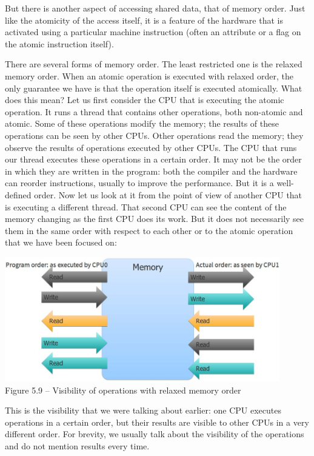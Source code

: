 But there is another aspect of accessing shared data, that of memory order. Just like the atomicity of the access itself, it is a feature of the hardware that is activated using a particular machine instruction (often an attribute or a flag on the atomic instruction itself).

There are several forms of memory order. The least restricted one is the relaxed memory order. When an atomic operation is executed with relaxed order, the only guarantee we have is that the operation itself is executed atomically. What does this mean? Let us first consider the CPU that is executing the atomic operation. It runs a thread that contains other operations, both non-atomic and atomic. Some of these operations modify the memory; the results of these operations can be seen by other CPUs. Other operations read the memory; they observe the results of operations executed by other CPUs. The CPU that runs our thread executes these operations in a certain order. It may not be the order in which they are written in the program: both the compiler and the hardware can reorder instructions, usually to improve the performance. But it is a well-defined order. Now let us look at it from the point of view of another CPU that is executing a different thread. That second CPU can see the content of the memory changing as the first CPU does its work. But it does not necessarily see them in the same order with respect to each other or to the atomic operation that we have been focused on:

\begin{center}
\includegraphics[width=0.9\textwidth]{content/1/chapter5/images/9.jpg}\\
Figure 5.9 – Visibility of operations with relaxed memory order
\end{center}

This is the visibility that we were talking about earlier: one CPU executes operations in a certain order, but their results are visible to other CPUs in a very different order. For brevity, we usually talk about the visibility of the operations and do not mention results every time.

